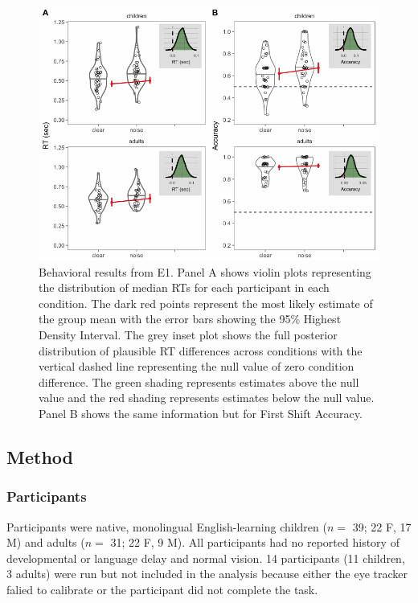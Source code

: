 \documentclass[10pt, letterpaper]{article}
\newenvironment{CodeChunk}{}{}
\begin{document}
\begin{CodeChunk}
\begin{figure}[t]

{\centering \includegraphics[width=0.8\linewidth]{figs/noise_acc_rt_e1_plot-1} 

}

\caption[Behavioral results from E1]{Behavioral results from E1. Panel A shows violin plots representing the distribution of median RTs for each participant in each condition. The dark red points represent the most likely estimate of the group mean with the error bars showing the 95\% Highest Density Interval. The grey inset plot shows the full posterior distribution of plausible RT differences across conditions with the vertical dashed line representing the null value of zero condition difference. The green shading represents estimates above the null value and the red shading represents estimates below the null value. Panel B shows the same information but for First Shift Accuracy.}\label{fig:noise_acc_rt_e1_plot}
\end{figure}
\end{CodeChunk}

\subsection{Method}\label{method}

\subsubsection{Participants}\label{participants}

Participants were native, monolingual English-learning children (\(n=\)
39; 22 F, 17 M) and adults (\(n=\) 31; 22 F, 9 M). All participants had
no reported history of developmental or language delay and normal
vision. 14 participants (11 children, 3 adults) were run but not
included in the analysis because either the eye tracker falied to
calibrate or the participant did not complete the task.
\end{document}
